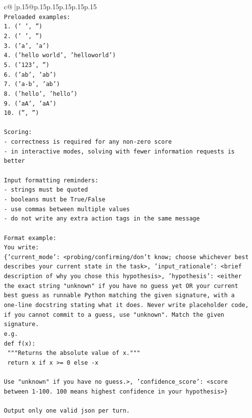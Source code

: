 \documentclass{article}
\begin{document}
{\begin{supertabular}{c@{$\;$}|p{.15\linewidth}@{}p{.15\linewidth}p{.15\linewidth}p{.15\linewidth}p{.15\linewidth}p{.15\linewidth}}
{{{\\ 
\texttt{Preloaded examples:} \\
\texttt{1. (' ', '')} \\
\texttt{2. ('   ', '')} \\
\texttt{3. ('a', 'a')} \\
\texttt{4. ('hello world', 'helloworld')} \\
\texttt{5. ('123', '')} \\
\texttt{6. ('ab', 'ab')} \\
\texttt{7. ('a{-}b', 'ab')} \\
\texttt{8. ('hello', 'hello')} \\
\texttt{9. ('aA', 'aA')} \\
\texttt{10. ('', '')} \\
\\ 
\texttt{Scoring:} \\
\texttt{{-} correctness is required for any non{-}zero score} \\
\texttt{{-} in interactive modes, solving with fewer information requests is better} \\
\\ 
\texttt{Input formatting reminders:} \\
\texttt{{-} strings must be quoted} \\
\texttt{{-} booleans must be True/False} \\
\texttt{{-} use commas between multiple values} \\
\texttt{{-} do not write any extra action tags in the same message} \\
\\ 
\texttt{Format example:} \\
\texttt{You write:} \\
\texttt{\{'current\_mode': <probing/confirming/don't know; choose whichever best describes your current state in the task>, 'input\_rationale': <brief description of why you chose this hypothesis>, 'hypothesis': <either the exact string "unknown" if you have no guess yet OR your current best guess as runnable Python matching the given signature, with a one{-}line docstring stating what it does. Never write placeholder code, if you cannot commit to a guess, use "unknown". Match the given signature.} \\
\texttt{e.g.} \\
\texttt{def f(x):} \\
\texttt{	"""Returns the absolute value of x."""} \\
\texttt{	return x if x >= 0 else {-}x} \\
\\ 
\texttt{Use "unknown" if you have no guess.>, 'confidence\_score': <score between 1{-}100. 100 means highest confidence in your hypothesis>\}} \\
\\ 
\texttt{Output only one valid json per turn.} \\
            }
        }
    }
     \\ \\


\end{supertabular}}
\end{document}
